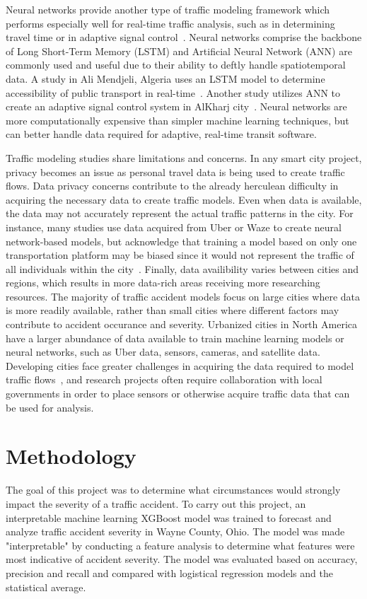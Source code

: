 \documentclass[12pt]{article}
\begin{document}
Neural networks provide another type of traffic modeling framework which performs especially well for real-time
traffic analysis, such as in determining travel time or in adaptive signal control~\cite{app15073866}. Neural networks comprise
the backbone of 
Long Short-Term Memory (LSTM) and Artificial Neural Network (ANN) are commonly used and useful due to their ability to 
deftly handle spatiotemporal data.
A study in Ali Mendjeli, Algeria uses an LSTM model to determine accessibility of public transport in real-time~\cite{Fenghour2025}. 
Another study utilizes ANN to create an adaptive signal control system in AlKharj city~\cite{LOUATI2025100407}. Neural networks
are more computationally expensive than simpler machine learning techniques, but can better handle data required for adaptive,
real-time transit software.

Traffic modeling studies share limitations and concerns. In any smart city project, privacy becomes an issue as personal travel data is being used to
create traffic flows. Data privacy concerns contribute to the already herculean difficulty in acquiring the necessary data to create traffic models.
Even when data is available, the data may not accurately represent the actual traffic patterns in the city. For instance, many studies use data acquired from Uber or Waze
to create neural network-based models, but acknowledge that training a model based on only one transportation platform may be biased since
it would not represent the traffic of all individuals within the city~\cite{HAMMOUMI2025813}. Finally, data availibility varies between cities and regions, which
results in more data-rich areas receiving more researching resources. The majority of traffic accident models focus on large cities where data is more
readily available, rather than small cities where different factors may contribute to accident occurance and severity.
Urbanized cities in North America have a larger abundance of data available to train machine learning models or neural networks, such as Uber 
data, sensors, cameras, and satellite data. Developing cities face greater challenges in acquiring the data required to model traffic flows~\cite{Dorosan},
and research projects often require collaboration with local governments in order to place sensors or otherwise acquire traffic data that can be used for analysis.

\section{Methodology}
The goal of this project was to determine what circumstances would strongly impact the severity of a traffic accident.
To carry out this project, an interpretable machine learning XGBoost model was trained to forecast and analyze traffic accident severity in Wayne County, Ohio. 
The model was made "interpretable" by conducting a feature analysis to determine what features were most indicative of 
accident severity. The model was evaluated based on accuracy, precision and recall and compared with logistical regression models and the statistical average.
\end{document}

